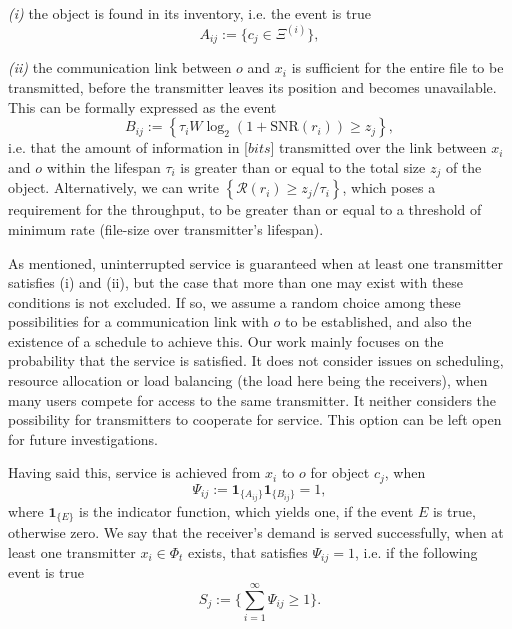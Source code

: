 \documentclass[conference]{IEEEtran}
\begin{document}
\emph{(i)} the object is found in its inventory, i.e. the event is true
\begin{equation}
\label{Aij}
A_{ij}:=\{c_j \in \Xi^{(i)}\},
\end{equation}

\emph{(ii)} the communication link between $o$ and $x_i$ is sufficient for the entire file to be transmitted, before the transmitter leaves its position and becomes unavailable. This can be formally expressed as the event
\begin{equation}
\label{Bij}
B_{ij}:={\left\{\tau_i W \log_2(1+\mathrm{SNR}(r_i)) \geq z_j\right\}},
\end{equation}
i.e. that the amount of information in [$bits$] transmitted over the link between $x_i$ and $o$ within the lifespan $\tau_i$ is greater than or equal to the total size $z_j$ of the object. Alternatively, we can write $\left\{\mathcal{R}(r_i)\geq z_j/\tau_i\right\}$, which poses a requirement for the throughput, to be greater than or equal to a threshold of minimum rate (file-size over transmitter's lifespan).

As mentioned, uninterrupted service is guaranteed when at least one transmitter satisfies (i) and (ii), but the case that more than one may exist with these conditions is not excluded. If so, we assume a random choice among these possibilities for a communication link with $o$ to be established, and also the existence of a schedule to achieve this. Our work mainly focuses on the probability that the service is satisfied. It does not consider issues on scheduling, resource allocation or load balancing (the load here being the receivers), when many users compete for access to the same transmitter. It neither considers the possibility for transmitters to cooperate for service. This option can be left open for future investigations. 

Having said this, service is achieved from $x_i$ to $o$ for object $c_j$, when 
\begin{equation}
   \Psi_{ij}:=\mathbf{1}_{\{A_{ij}\}} \mathbf{1}_{\{B_{ij}\}}=1,
\end{equation}
where $\mathbf{1}_{\{E\}}$ is the indicator function, which yields one, if the event $E$ is true, otherwise zero. We say that the receiver's demand is served successfully, when at least one transmitter $x_i\in\Phi_t$ exists, that satisfies $\Psi_{ij}=1$, i.e. if the following event is true
\begin{equation}
\label{Sj}
S_j := \{\sum_{i=1}^{\infty} \Psi_{ij} \geq 1\}.
\end{equation}
\end{document}
